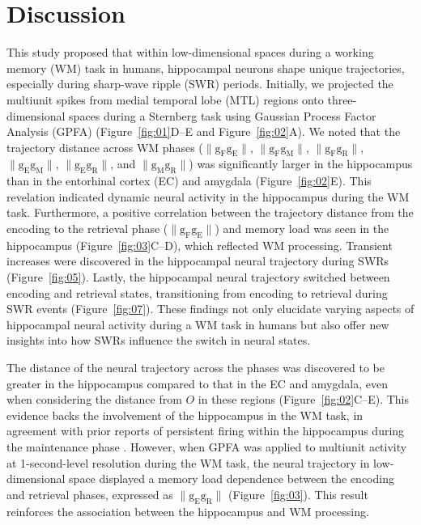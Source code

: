 \documentclass[final,3p,times,twocolumn]{elsarticle}
\begin{document}
\section{Discussion}
This study proposed that within low-dimensional spaces during a working memory (WM) task in humans, hippocampal neurons shape unique trajectories, especially during sharp-wave ripple (SWR) periods. Initially, we projected the multiunit spikes from medial temporal lobe (MTL) regions onto three-dimensional spaces during a Sternberg task using Gaussian Process Factor Analysis (GPFA) (Figure~\ref{fig:01}D--E and Figure~\ref{fig:02}A). We noted that the trajectory distance across WM phases ($\mathrm{\lVert g_{F}g_{E} \rVert}$, $\mathrm{\lVert g_{F}g_{M} \rVert}$, $\mathrm{\lVert g_{F}g_{R} \rVert}$, $\mathrm{\lVert g_{E}g_{M} \rVert}$, $\mathrm{\lVert g_{E}g_{R} \rVert}$, and $\mathrm{\lVert g_{M}g_{R} \rVert}$) was significantly larger in the hippocampus than in the entorhinal cortex (EC) and amygdala (Figure~\ref{fig:02}E). This revelation indicated dynamic neural activity in the hippocampus during the WM task. Furthermore, a positive correlation between the trajectory distance from the encoding to the retrieval phase ($\mathrm{\lVert g_{F}g_{E} \rVert}$) and memory load was seen in the hippocampus (Figure~\ref{fig:03}C--D), which reflected WM processing. Transient increases were discovered in the hippocampal neural trajectory during SWRs (Figure~\ref{fig:05}). Lastly, the hippocampal neural trajectory switched between encoding and retrieval states, transitioning from encoding to retrieval during SWR events (Figure~\ref{fig:07}). These findings not only elucidate varying aspects of hippocampal neural activity during a WM task in humans but also offer new insights into how SWRs influence the switch in neural states.

The distance of the neural trajectory across the phases was discovered to be greater in the hippocampus compared to that in the EC and amygdala, even when considering the distance from $O$ in these regions (Figure~\ref{fig:02}C--E). This evidence backs the involvement of the hippocampus in the WM task, in agreement with prior reports of persistent firing within the hippocampus during the maintenance phase \cite{boran_persistent_2019} \cite{kaminski_persistently_2017} \cite{kornblith_persistent_2017} \cite{faraut_dataset_2018}. However, when GPFA was applied to multiunit activity at 1-second-level resolution during the WM task, the neural trajectory in low-dimensional space displayed a memory load dependence between the encoding and retrieval phases, expressed as $\mathrm{\lVert g_{E}g_{R} \rVert}$ (Figure~\ref{fig:03}). This result reinforces the association between the hippocampus and WM processing.
\end{document}
